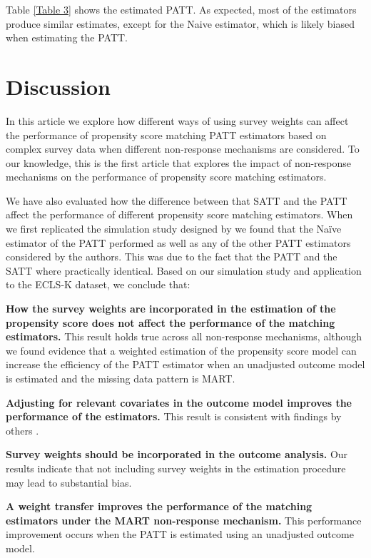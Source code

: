 \documentclass[oupdraft]{bio}
\begin{document}
Table \ref{Table 3} shows the estimated PATT.  As expected, most of the estimators produce similar estimates, except for the Naive estimator, which is likely biased when estimating the PATT. 

\section{Discussion}
\label{S5}
In this article we explore how different ways of using survey weights can affect the performance of propensity score matching PATT estimators based on complex survey data when different non-response mechanisms are considered. To our knowledge, this is the first article that explores the impact of non-response mechanisms on the performance of propensity score matching estimators. 

We have also evaluated how the difference between that SATT and the PATT affect the performance of different propensity score matching estimators. When we first replicated the simulation study designed by \citet{austin2016propensity} we found that the Naïve estimator of the PATT performed as well as any of the other PATT estimators considered by the authors. This was due to the fact that the PATT and the SATT where practically identical. 
Based on our simulation study and application to the ECLS-K dataset, we conclude that: 

\textbf{How the survey weights are incorporated in the estimation of the propensity score does not affect the performance of the matching estimators.} This result holds true across all non-response mechanisms, although we found evidence that a weighted estimation of the propensity score model can increase the efficiency of the PATT estimator when an unadjusted outcome model is estimated and the missing data pattern is MART. 

\textbf{Adjusting for relevant covariates in the outcome model improves the performance of the estimators.} This result is consistent with findings by others \citep[e.g.,][]{drake1993effects,mccaffrey2004propensity,frolich2007propensity,robins2007comment,lee2011weight,imai2014covariate,ridgeway2015propensity}. 

\textbf{Survey weights should be incorporated in the outcome analysis.} Our results indicate that not including survey weights in the estimation procedure may lead to substantial bias.  

\textbf{A weight transfer improves the performance of the matching estimators under the MART non-response mechanism.} This performance improvement occurs when the PATT is estimated using an unadjusted outcome model. 
\end{document}
